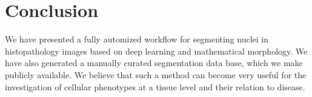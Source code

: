 \documentclass{article}
\begin{document}
\section{Conclusion}
\label{sec:conclusion}

We have presented a fully automized workflow for segmenting nuclei in
histopathology images based on deep learning and mathematical
morphology. We have also generated a manually curated segmentation
data base, which we make publicly available. We believe that such a
method can become very useful for the investigation of cellular
phenotypes at a tissue level and their relation to disease. 



\end{document}
